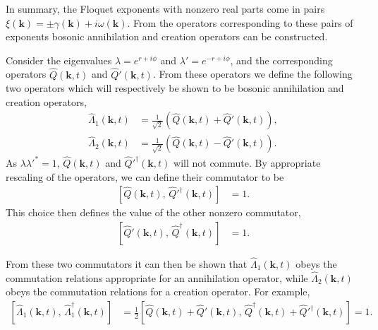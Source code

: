 In summary, the Floquet exponents with nonzero real parts come in pairs $\xi(\bm{k}) = \pm \gamma(\bm{k}) + i \omega(\bm{k})$. From the operators corresponding to these pairs of exponents bosonic annihilation and creation operators can be constructed.

Consider the eigenvalues $\displaystyle \lambda = e^{r + i \phi}$ and $\displaystyle \lambda' = e^{-r + i\phi}$, and the corresponding operators $\hat{Q}(\bm{k}, t)$ and $\hat{Q}'(\bm{k}, t)$. From these operators we define the following two operators which will respectively be shown to be bosonic annihilation and creation operators,
\begin{align}
    \hat{\Lambda}_1(\bm{k}, t) &= \frac{1}{\sqrt{2}} \left( \hat{Q}(\bm{k}, t) + \hat{Q}'(\bm{k}, t)\right),\\
    \hat{\Lambda}_2(\bm{k}, t) &= \frac{1}{\sqrt{2}} \left( \hat{Q}(\bm{k}, t) - \hat{Q}'(\bm{k}, t)\right).
\end{align}
As $\lambda \lambda'^* = 1$, $\hat{Q}(\bm{k}, t)$ and $\hat{Q}'^\dagger(\bm{k}, t)$ will not commute. By appropriate rescaling of the operators, we can define their commutator to be
\begin{align}
    \left[ \hat{Q}(\bm{k}, t),\, \hat{Q}'^\dagger(\bm{k}, t) \right] &= 1.
\end{align}
This choice then defines the value of the other nonzero commutator,
\begin{align}
    \left[ \hat{Q}'(\bm{k}, t),\, \hat{Q}^\dagger(\bm{k}, t) \right] &= 1.
\end{align}

From these two commutators it can then be shown that $\hat{\Lambda}_1(\bm{k}, t)$ obeys the commutation relations appropriate for an annihilation operator, while $\hat{\Lambda}_2(\bm{k}, t)$ obeys the commutation relations for a creation operator. For example,
\begin{align}
    \left[\hat{\Lambda}_1^{\phantom{\dagger}}(\bm{k}, t),\, \hat{\Lambda}_1^\dagger(\bm{k}, t) \right] &= \frac{1}{2} \left[ \hat{Q}(\bm{k}, t) + \hat{Q}'(\bm{k}, t),\, \hat{Q}^\dagger(\bm{k}, t) + \hat{Q}'^\dagger(\bm{k}, t)\right] = 1.
\end{align}

